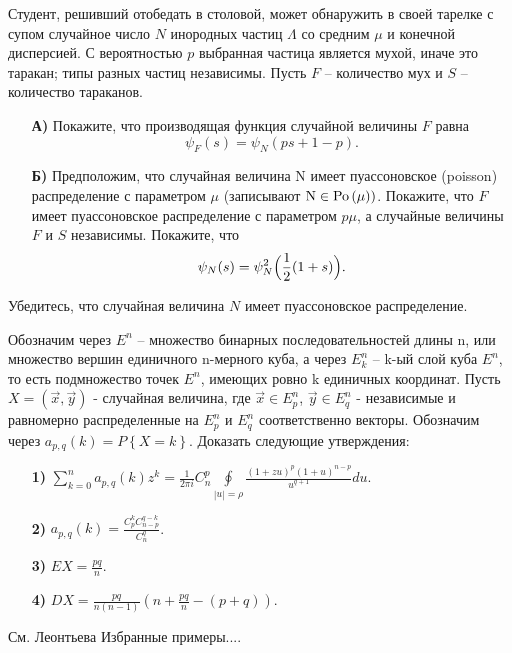 \begin{problem}
Студент, решивший отобедать в 
столовой, может обнаружить в своей тарелке с супом случайное число $N$ 
инородных частиц $\Lambda $ со средним $\mu $ и конечной дисперсией. С 
вероятностью $p$ выбранная частица является мухой, иначе это таракан; типы 
разных частиц независимы. Пусть $F$ -- количество мух и $S$ -- количество тараканов.

\begin{enumerate}
\item[\textbf{А)}] Покажите, что производящая функция случайной величины $F$ равна
\[
\psi _F (s)=\psi _N (ps+1-p).
\]

\item[\textbf{Б)}] Предположим, что случайная величина N имеет пуассоновское 
(poisson) распределение с параметром $\mu $ (записывают $\mbox{N}\in 
\mathrm{Po}\left( \mu \right))$. Покажите, что $F$ имеет пуассоновское распределение с 
параметром $p\mu $, а случайные величины $F$ и $S$ независимы. Покажите, что
\[
\psi _N (s)=\psi _N^2 \Bigl( {\frac{1}{2}(1+s)} \Bigr).
\]
\end{enumerate}
Убедитесь, что случайная величина $N$ имеет пуассоновское распределение.
\end{problem}

\begin{problem} 
Обозначим через $E^n$ -- множество бинарных последовательностей длины n, или множество вершин 
единичного n-мерного куба, а через $E_k^n $ -- k-ый слой куба $E^n$, то есть 
подмножество точек $E^n$, имеющих ровно k единичных координат. Пусть 
$X=\left( {\vec {x},\vec {y}} \right)$ - случайная величина, где $\vec 
{x}\in E_p^n $, $\vec {y}\in E_q^n $ - независимые и равномерно 
распределенные на $E_p^n $ и $E_q^n $ соответственно векторы. Обозначим 
через $a_{p,q} (k)=P\left\{ {X=k} \right\}$. Доказать следующие утверждения:

\begin{enumerate}
\item[\textbf{1)}] $\sum\limits_{k=0}^n {a_{p,q} (k)z^k} =\frac{1}{2\pi i}C_n^p 
\oint\limits_{\left| u \right|=\rho } 
{\frac{(1+zu)^p(1+u)^{n-p}}{u^{q+1}}du} $.

\item[\textbf{2)}] $a_{p,q} (k)=\frac{C_p^k C_{n-p}^{q-k} }{C_n^q }$.

\item[\textbf{3)}] $EX=\frac{pq}{n}$.

\item[\textbf{4)}] $DX=\frac{pq}{n(n-1)}\left( {n+\frac{pq}{n}-(p+q)} \right)$.
\end{enumerate}
\end{problem}

\begin{fixme}
См. Леонтьева Избранные примеры.... 
\end{fixme}




